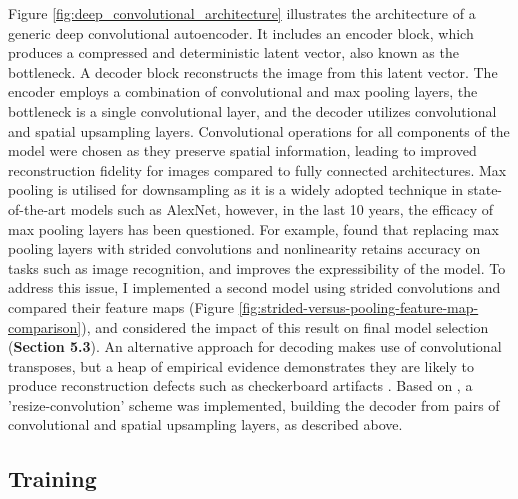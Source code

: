 \documentclass[10pt,twocolumn,letterpaper]{article}
\begin{document}
Figure \ref{fig:deep_convolutional_architecture} illustrates the architecture of a generic deep convolutional autoencoder. It includes an encoder block, which produces a compressed and deterministic latent vector, also known as the bottleneck. A decoder block reconstructs the image from this latent vector. The encoder employs a combination of convolutional and max pooling layers, the bottleneck is a single convolutional layer, and the decoder utilizes convolutional and spatial upsampling layers. Convolutional operations for all components of the model were chosen as they preserve spatial information, leading to improved reconstruction fidelity for images compared to fully connected architectures. Max pooling is utilised for downsampling as it is a widely adopted technique in state-of-the-art models such as AlexNet, however, in the last 10 years, the efficacy of max pooling layers has been questioned. For example, \cite{strivingforsimplicity} found that replacing max pooling layers with strided convolutions and nonlinearity retains accuracy on tasks such as image recognition, and improves the expressibility of the model. To address this issue, I implemented a second model using strided convolutions and compared their feature maps (Figure \ref{fig:strided-versus-pooling-feature-map-comparison}), and considered the impact of this result on final model selection (\textbf{Section 5.3}). An alternative approach for decoding makes use of convolutional transposes, but a heap of empirical evidence demonstrates they are likely to produce reconstruction defects such as checkerboard artifacts \cite{deconvolution}. Based on \cite{deconvolution}, a 'resize-convolution' scheme was implemented, building the decoder from pairs of convolutional and spatial upsampling layers, as described above.

\subsection{Training}
\end{document}
